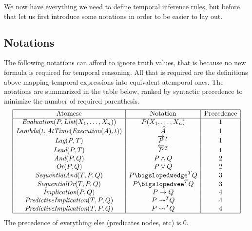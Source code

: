 \documentclass[runningheads]{llncs}
\newcommand{\TEval}{\textit{Evaluation}}
\newcommand{\TList}{\textit{List}}
\newcommand{\TLamb}{\textit{Lambda}}
\newcommand{\TExec}{\textit{Execution}}
\newcommand{\TAtTime}{\textit{AtTime}}
\newcommand{\TAnd}{\textit{And}}
\newcommand{\TOr}{\textit{Or}}
\newcommand{\TImpl}{\textit{Implication}}
\newcommand{\TPredImpl}{\textit{PredictiveImplication}}
\newcommand{\TSeqAnd}{\textit{SequentialAnd}}
\newcommand{\TSeqOr}{\textit{SequentialOr}}
\newcommand{\TLag}{\textit{Lag}}
\newcommand{\TLead}{\textit{Lead}}
\newcommand{\limp}{\rightarrow}
\newcommand{\lpreimp}[1]{\leadsto^{#1}}
\newcommand{\lseqor}[1]{\bigslopedvee^{#1}}
\newcommand{\lseqand}[1]{\bigslopedwedge^{#1}}
\newcommand{\ldo}[1]{\widehat{#1}}
\newcommand{\llag}[2]{\overrightarrow{#1}^{#2}}
\newcommand{\llead}[2]{\overleftarrow{#1}^{#2}}
\begin{document}
We now have everything we need to define temporal inference rules, but
before that let us first introduce some notations in order to be
easier to lay out.

\subsection{Notations}

The following notations can afford to ignore truth values, that is
because no new formula is required for temporal reasoning.  All that
is required are the definitions above mapping temporal expressions
into equivalent atemporal ones.  The notations are summarized in the
table below, ranked by syntactic precedence to minimize the number of
required parenthesis.
\renewcommand{\arraystretch}{1.5}
$$
\begin{array}{|c|c|c|}
  \hline
  \text{Atomese} & \text{Notation} & \text{Precedence} \\
  \hline
  \TEval(P, \TList(X_1, \dots, X_n)) & P(X_1, \dots, X_n) & 1 \\
  \TLamb(t, \TAtTime(\TExec(A), t)) & \ldo{A} & 1 \\
  \TLag(P, T) & \llag{P}{T} & 1 \\
  \TLead(P, T) & \llead{P}{T} & 1 \\
  \TAnd(P, Q) & P \land Q & 2 \\
  \TOr(P, Q) & P \lor Q & 2 \\
  \TSeqAnd(T, P, Q) & P \lseqand{T} Q & 3 \\
  \TSeqOr(T, P, Q) & P \lseqor{T} Q & 3 \\
  \TImpl(P, Q) & P \limp Q & 4 \\
  \TPredImpl(T, P, Q) & P \lpreimp{T} \! \! Q & 4 \\
  \TPredImpl(T, P, Q) & P \lpreimp{T} \! \! Q & 4 \\
  \hline
\end{array}
$$
\renewcommand{\arraystretch}{1}
The precedence of everything else (predicates nodes, etc) is 0.

\end{document}
